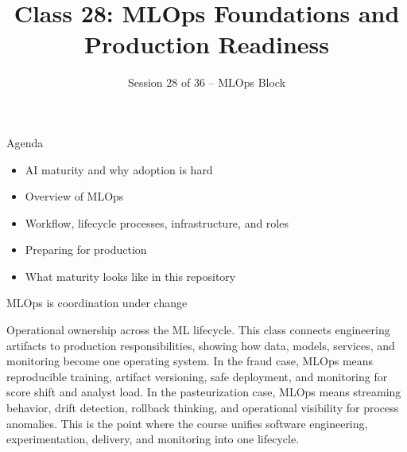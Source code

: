 

\title{Class 28: MLOps Foundations and Production Readiness}
\subtitle{Session 28 of 36 -- MLOps Block}
\author{\coursename}
\date{}



\frame{\titlepage \coursefooter}

\begin{frame}{Agenda}
\begin{itemize}
\item AI maturity and why adoption is hard
\item Overview of MLOps
\item Workflow, lifecycle processes, infrastructure, and roles
\item Preparing for production
\item What maturity looks like in this repository
\end{itemize}
\coursefooter
\end{frame}

\begin{frame}{MLOps is coordination under change}
\coursefooter
\end{frame}

\coursecontextframe
{Operational ownership across the ML lifecycle.}
{This class connects engineering artifacts to production responsibilities, showing how data, models, services, and monitoring become one operating system.}
{In the fraud case, MLOps means reproducible training, artifact versioning, safe deployment, and monitoring for score shift and analyst load.}
{In the pasteurization case, MLOps means streaming behavior, drift detection, rollback thinking, and operational visibility for process anomalies.}
{This is the point where the course unifies software engineering, experimentation, delivery, and monitoring into one lifecycle.}


